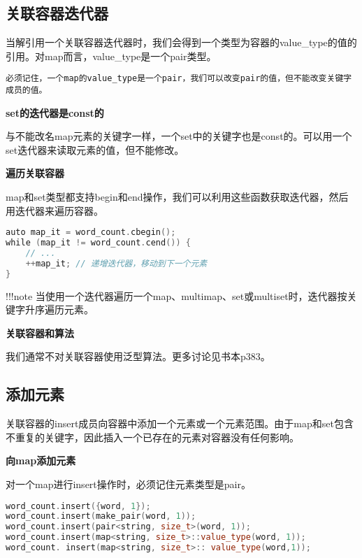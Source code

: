 \documentclass[
  a4paper,
  oneside,tablecaptionabove
]{scrbook}
\begin{document}
\subsection{关联容器迭代器}\label{ux5173ux8054ux5bb9ux5668ux8fedux4ee3ux5668}

当解引用一个关联容器迭代器时，我们会得到一个类型为容器的value\_type的值的引用。对map而言，value\_type是一个pair类型。

\begin{lstlisting}
必须记住，一个map的value_type是一个pair，我们可以改变pair的值，但不能改变关键字成员的值。
\end{lstlisting}

\textbf{set的迭代器是const的}

与不能改名map元素的关键字一样，一个set中的关键字也是const的。可以用一个set迭代器来读取元素的值，但不能修改。

\textbf{遍历关联容器}

map和set类型都支持begin和end操作，我们可以利用这些函数获取迭代器，然后用迭代器来遍历容器。

\begin{lstlisting}[language={C++}]
auto map_it = word_count.cbegin();
while (map_it != word_count.cend()) {
    // ...
    ++map_it; // 递增迭代器，移动到下一个元素
}
\end{lstlisting}

!!!note
当使用一个迭代器遍历一个map、multimap、set或multiset时，迭代器按关键字升序遍历元素。

\textbf{关联容器和算法}

我们通常不对关联容器使用泛型算法。更多讨论见书本p383。

\subsection{添加元素}\label{ux6dfbux52a0ux5143ux7d20}

关联容器的insert成员向容器中添加一个元素或一个元素范围。由于map和set包含不重复的关键字，因此插入一个已存在的元素对容器没有任何影响。

\textbf{向map添加元素}

对一个map进行insert操作时，必须记住元素类型是pair。

\begin{lstlisting}[language={C++}]
word_count.insert({word, 1});
word_count.insert(make_pair(word, 1));
word_count.insert(pair<string, size_t>(word, 1));
word_count.insert(map<string, size_t>::value_type(word, 1));
word_count. insert(map<string, size_t>:: value_type(word,1));
\end{lstlisting}
\end{document}
